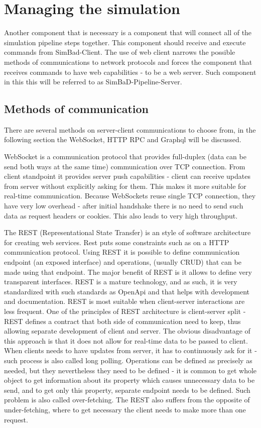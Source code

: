 \section{Managing the simulation}
Another component that is necessary is a component that will connect all of the simulation pipeline steps together. This component should receive and execute commands from SimBad-Client. The use of web client narrows the possible methods of communications to network protocols and forces the component that receives commands to have web capabilities - to be a web server. Such component in this this will be referred to as SimBaD-Pipeline-Server. 
\subsection{Methods of communication}
There are several methods on server-client communications to choose from, in the following section the WebSocket, HTTP RPC and Graphql will be discussed.

WebSocket is a communication protocol that provides full-duplex (data can be send both ways at the same time) communication over TCP connection. From client standpoint it provides server push capabilities - client can receive updates from server without explicitly asking for them. This makes it more suitable for real-time communication. Because WebSockets reuse single TCP connection, they have very low overhead - after initial handshake there is no need to send such data as request headers or cookies. This also leads to very high throughput. 

The REST (Representational State Transfer) is an style of software architecture for creating web services. Rest puts some constraints such as  on a HTTP communication protocol. Using REST it is possible to define communication endpoint (an exposed interface) and operations, (usually CRUD) that can be made using that endpoint. The major benefit of REST is it allows to define very transparent interfaces. REST is a mature technology, and as such, it is very standardized with such standards as OpenApi and that helps with development and documentation. REST is most suitable when client-server interactions are less frequent. One of the principles of REST architecture is client-server split - REST defines a contract that both side of communication need to keep, thus allowing separate development of client and server. The obvious disadvantage of this approach is that it does not allow for real-time data to be passed to client. When clients needs to have updates from server, it has to continuously ask for it - such process is also called long polling. Operations can be defined as precisely as needed, but they nevertheless they need to be defined - it is common to get whole object to get information about its property which causes unnecessary data to be send, and to get only this property, separate endpoint needs to be defined. Such problem is also called over-fetching. The REST also suffers from the opposite of under-fetching, where to get necessary the client needs to make more than one request.

